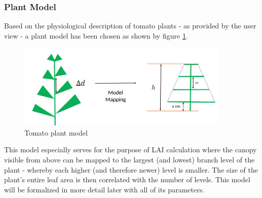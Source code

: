 \graphicspath{{members/ssr/figures/}}

\subsubsection*{Plant Model}

Based on the physiological description of tomato plants - as provided by the user view - a plant model has
been chosen as shown by figure \ref{fig:plant:model:2}.

\begin{figure}[H]
    \centering
    \includegraphics[width=0.9\textwidth,height=\textheight,keepaspectratio]{modelling/plant-model-3.png}
    \caption{Tomato plant model}
    \label{fig:plant:model:2}
\end{figure}

This model especially serves for the purpose of LAI calculation where the canopy visible from above can 
be mapped to the largest (and lowest) branch level of the plant - whereby each higher (and therefore newer)
level is smaller.
The size of the plant's entire leaf area is then correlated with the number of levels.
This model will be formalized in more detail later with all of its parameters. 
